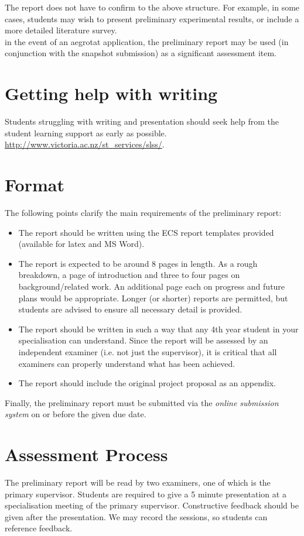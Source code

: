 The report does not have to confirm to the above structure.
For example, in some cases, students may wish to present preliminary
experimental results, or include a more detailed literature survey.\\

 in the event of an aegrotat application, the preliminary
report may be used (in conjunction with the snapshot submission) as a significant assessment item.

\section{Getting help with writing}
Students struggling with writing and presentation should seek help from the student learning support as early as possible.
{\footnotesize \url{http://www.victoria.ac.nz/st_services/slss/}}.


\section{Format}
The following points clarify the main requirements of the preliminary
report:
\begin{itemize}
\item The report should be written using the ECS report templates provided
(available for latex and MS Word).
\item The report is expected to be around 8 pages in length. As a rough
breakdown, a page of introduction and three to four pages on
background/related work.  An additional page each on progress
and future plans would be appropriate. Longer (or shorter) reports are
permitted, but students are advised to ensure all necessary detail is provided.
\item The report should be written in such a way that any 4th year student in your specialisation
  can understand.  Since the report will be assessed by an independent
  examiner (i.e. not just the supervisor), it is critical that all
  examiners can properly understand what has been achieved.
\item The report should include the original project proposal as an
  appendix.
\end{itemize}
Finally, the preliminary report must be submitted via the {\em online
  submission system} on or before the given due date.


\section{Assessment Process}

The preliminary report will be read by two examiners, one of
which is the primary supervisor. Students are required to give a 5 minute
presentation at a specialisation meeting of the primary supervisor.
Constructive feedback should be given after the presentation.
We may record the sessions, so students can reference feedback.


